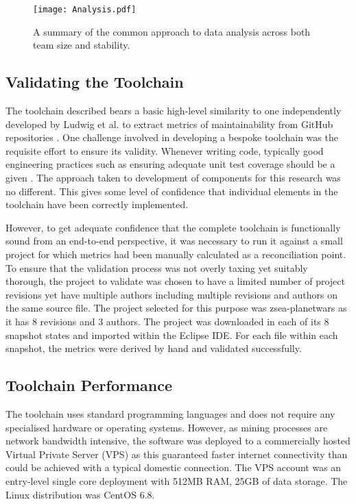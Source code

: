  \begin{figure}[htbp!] 
 \centering    
 \texttt{[image: Analysis.pdf]}
 \caption[A summary of the data analysis approach.]{A summary of the common approach to data analysis across both team size and stability.}
 \label{fig:Analysis}
 \end{figure}

\subsection{Validating the Toolchain}
The toolchain described bears a basic high-level similarity to one independently developed by Ludwig et al. to extract metrics of maintainability from GitHub repositories \citep{ludwig2017compiling}. One challenge involved in developing a bespoke toolchain was the requisite effort to ensure its validity. Whenever writing code, typically good engineering practices such as ensuring adequate unit test coverage should be a given \citep{tosun2018effectiveness}. The approach taken to development of components for this research was no different. This gives some level of confidence that individual elements in the toolchain have been correctly implemented. 

However, to get adequate confidence that the complete toolchain is functionally sound from an end-to-end perspective, it was necessary to run it against a small project for which metrics had been manually calculated as a reconciliation point. To ensure that the validation process was not overly taxing yet suitably thorough, the project to validate was chosen to have a limited number of project revisions yet have multiple authors including multiple revisions and authors on the same source file. The project selected for this purpose was zsea-planetwars as it has 8 revisions and 3 authors. The project was downloaded in each of its 8 snapshot states and imported within the Eclipse IDE. For each file within each snapshot, the metrics were derived by hand and validated successfully.

\subsection{Toolchain Performance}
The toolchain uses standard programming languages and does not require any specialised hardware or operating systems. However, as mining processes are network bandwidth intensive, the software was deployed to a commercially hosted Virtual Private Server (VPS) as this guaranteed faster internet connectivity than could be achieved with a typical domestic connection. The VPS account was an entry-level single core deployment with 512MB RAM, 25GB of data storage. The Linux distribution was CentOS 6.8.

